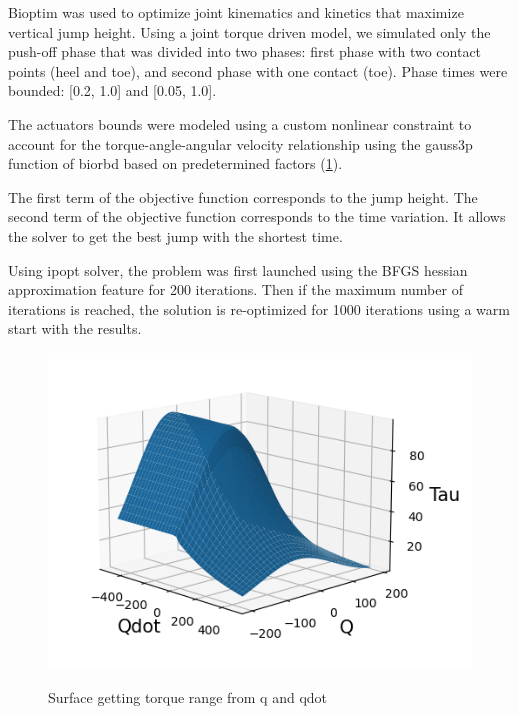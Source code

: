 Bioptim was used to optimize joint kinematics and kinetics that maximize vertical jump height.
Using a joint torque driven model, we simulated only the push-off phase that was divided into two phases:
first phase with two contact points (heel and toe),
and second phase with one contact (toe). Phase times were bounded: [0.2, 1.0] and [0.05, 1.0].

The actuators bounds were modeled using a custom nonlinear constraint to account for the torque-angle-angular
velocity relationship using the gauss3p function of biorbd based on predetermined factors
(\ref{fig:graph_force_vitesse_longueur}).

The first term of the objective function corresponds to the jump height.
The second term of the objective function corresponds to the time variation.
It allows the solver to get the best jump with the shortest time.

Using ipopt solver, the problem was first launched using the BFGS hessian approximation feature for 200 iterations.
Then if the maximum number of iterations is reached,
the solution is re-optimized for 1000 iterations using a warm start with the results.

\begin{figure}[t!]
\includegraphics[width=\textwidth/2]{figures/graph_force_vitesse_longueur.png}\\
\caption{Surface getting torque range from q and qdot}
\label{fig:graph_force_vitesse_longueur}
\end{figure}
